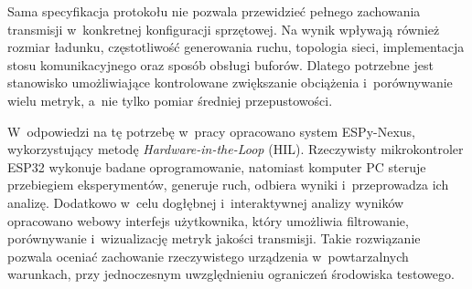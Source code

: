 Sama specyfikacja protokołu nie pozwala przewidzieć pełnego zachowania transmisji w~konkretnej konfiguracji sprzętowej.
Na wynik wpływają również rozmiar ładunku, częstotliwość generowania ruchu, topologia sieci, implementacja stosu komunikacyjnego oraz sposób obsługi buforów.
Dlatego potrzebne jest stanowisko umożliwiające kontrolowane zwiększanie obciążenia i~porównywanie wielu metryk, a~nie tylko pomiar średniej przepustowości.

W~odpowiedzi na tę potrzebę w~pracy opracowano system ESPy-Nexus, wykorzystujący metodę \textit{Hardware-in-the-Loop} (HIL).
Rzeczywisty mikrokontroler ESP32 wykonuje badane oprogramowanie, natomiast komputer PC steruje przebiegiem eksperymentów, generuje ruch, odbiera wyniki i~przeprowadza ich analizę.
Dodatkowo w~celu dogłębnej i~interaktywnej analizy wyników opracowano webowy interfejs użytkownika, który umożliwia filtrowanie, porównywanie i~wizualizację metryk jakości transmisji.
Takie rozwiązanie pozwala oceniać zachowanie rzeczywistego urządzenia w~powtarzalnych warunkach, przy jednoczesnym uwzględnieniu ograniczeń środowiska testowego.
